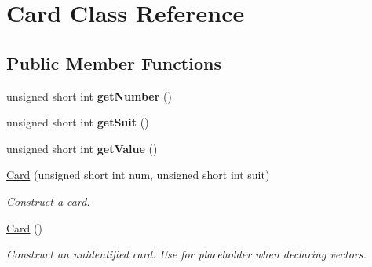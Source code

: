\hypertarget{class_card}{}\section{Card Class Reference}
\label{class_card}
\subsection*{Public Member Functions}
\begin{DoxyCompactItemize}
\item 
\mbox{\label{class_card_af72b2c2df9b82f3e4c97808668a8563d}} 
unsigned short int {\bfseries get\+Number} ()
\item 
\mbox{\label{class_card_a69cd2cb8997a05d806723e47ec53c93e}} 
unsigned short int {\bfseries get\+Suit} ()
\item 
\mbox{\label{class_card_a6213417106cb3d3d5a824b81d2d9c1c6}} 
unsigned short int {\bfseries get\+Value} ()
\item 
\hyperlink{class_card_ab1406a01ecfea3110f8e6188e11c4863}{Card} (unsigned short int num, unsigned short int suit)
\begin{DoxyCompactList}\small\item\em Construct a card. \end{DoxyCompactList}\item 
\mbox{\label{class_card_a783f5854cbe8c183ee3d4414c01472c0}} 
\hyperlink{class_card_a783f5854cbe8c183ee3d4414c01472c0}{Card} ()
\begin{DoxyCompactList}\small\item\em Construct an unidentified card. Use for placeholder when declaring vectors. \end{DoxyCompactList}\end{DoxyCompactItemize}
